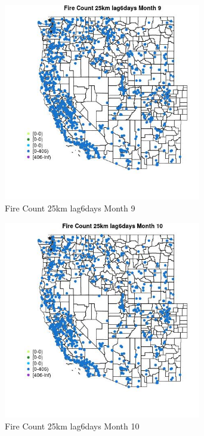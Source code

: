 \begin{figure} 
\centering  
\includegraphics[width=0.77\textwidth]{Code_Outputs/Report_ML_input_PM25_Step4_part_f_de_duplicated_aveswNAs_MapObsMo9Fire_Count_25km_lag6days.jpg} 
\caption{\label{fig:Report_ML_input_PM25_Step4_part_f_de_duplicated_aveswNAsMapObsMo9Fire_Count_25km_lag6days}Fire Count 25km lag6days Month 9} 
\end{figure} 
 

\clearpage 

\begin{figure} 
\centering  
\includegraphics[width=0.77\textwidth]{Code_Outputs/Report_ML_input_PM25_Step4_part_f_de_duplicated_aveswNAs_MapObsMo10Fire_Count_25km_lag6days.jpg} 
\caption{\label{fig:Report_ML_input_PM25_Step4_part_f_de_duplicated_aveswNAsMapObsMo10Fire_Count_25km_lag6days}Fire Count 25km lag6days Month 10} 
\end{figure} 
 

